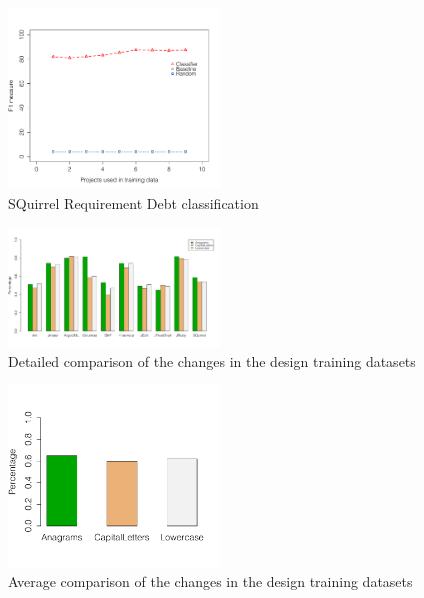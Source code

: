 \begin{figure}[thb!]
  \centering
  \includegraphics[width=0.50\textwidth]{figures/implementation_sql.pdf}
  \vspace{-3mm}
  \caption{SQuirrel Requirement Debt classification}
  \label{fig:implementation_sql}
\end{figure}

\clearpage

\begin{figure}[thb!]
  \centering
  \includegraphics[width=0.50\textwidth]{figures/detailed_comparison_design_training_dataset.pdf}
  \vspace{-3mm}
  \caption{Detailed comparison of the changes in the design training datasets}
  \label{fig:detailed_comparison_design_training_dataset}
\end{figure}

\begin{figure}[thb!]
  \centering
  \includegraphics[width=0.50\textwidth]{figures/average_comparison_design_training_dataset.pdf}
  \vspace{-3mm}
  \caption{Average comparison of the changes in the design training datasets}
  \label{fig:average_comparison_design_training_dataset}
\end{figure}

